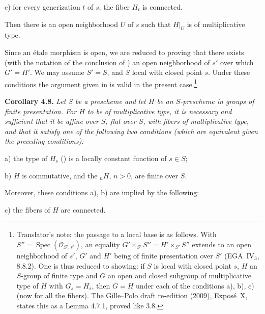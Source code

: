 \smallskip
\noindent
c) for every generization \(t\) of \(s\), the fiber \(H_t\) is connected.

\smallskip
Then there is an open neighborhood \(U\) of \(s\) such that \(H|_U\) is of
multiplicative type.
\par\endgroup

Since an étale morphism is open, we are reduced to proving that there exists
(with the notation of the conclusion of ) an open neighborhood of \(s'\)
over which \(G'=H'\). We may assume \(S'=S\), and \(S\) local with closed
point \(s\). Under these conditions the argument given in  is valid in
the present case.\footnote{Translator's note: the passage to a local base is
as follows. With \(S''=\operatorname{Spec}(\mathcal O_{S',s'})\), an equality
\(G'\times_{S'}S''=H'\times_{S'}S''\) extends to an open neighborhood of
\(s'\), \(G'\) and \(H'\) being of finite presentation over \(S'\)
(EGA~IV\(_3\), 8.8.2). One is thus reduced to showing: if \(S\) is local with
closed point \(s\), \(H\) an \(S\)-group of finite type and \(G\) an open and
closed subgroup of multiplicative type of \(H\) with \(G_s=H_s\), then
\(G=H\) under each of the conditions a), b), c) (now for all the fibers). The
Gille--Polo draft re-edition (2009), Expos\'e~X, states this as a Lemma
4.7.1, proved like 3.8.}

\par\medskip\noindent
\textbf{Corollary 4.8.}\enspace
\begingroup\itshape
Let \(S\) be a prescheme and let \(H\) be an \(S\)-prescheme in groups of
finite presentation. For \(H\) to be of multiplicative type, it is necessary
and sufficient that it be affine over \(S\), flat over \(S\), with fibers of
multiplicative type, and that it satisfy one of the following two conditions
(which are equivalent given the preceding conditions):

\smallskip
\noindent
{}a) the type of \(H_s\) () is a locally constant function of
\(s\in S\);

\smallskip
\noindent
{}b) \(H\) is commutative, and the \({}_nH\), \(n>0\), are finite over \(S\).

\smallskip
Moreover, these conditions a), b) are implied by the following:

\smallskip
\noindent
c) the fibers of \(H\) are connected.
\par\endgroup

